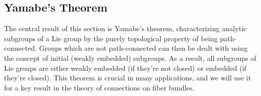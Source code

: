 




\subsection{Yamabe's Theorem}\label{sec: Yamabe's theorem}

The central result of this section is Yamabe's theorem, characterizing analytic subgroups of a Lie group by the purely topological property of being path-connected. Groups which are not path-connected can then be dealt with using the concept of initial (weakly embedded) subgroups. As a result, all subgroups of Lie groups are either weakly embedded (if they're not closed) or embedded (if they're closed). This theorem is crucial in many applications, and we will use it for a key result in the theory of connections on fiber bundles.


